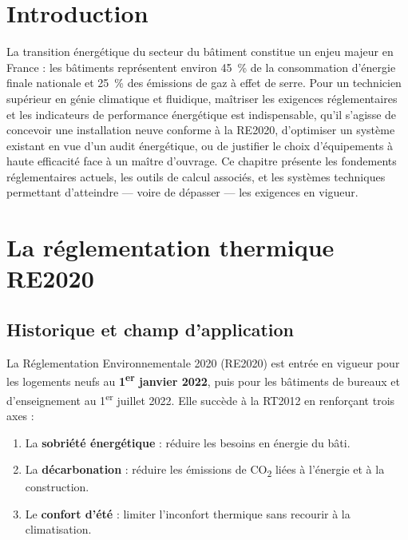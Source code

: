 \section{Introduction}

La transition énergétique du secteur du bâtiment constitue un enjeu majeur en France : les bâtiments représentent environ 45~\% de la consommation d'énergie finale nationale et 25~\% des émissions de gaz à effet de serre. Pour un technicien supérieur en génie climatique et fluidique, maîtriser les exigences réglementaires et les indicateurs de performance énergétique est indispensable, qu'il s'agisse de concevoir une installation neuve conforme à la RE2020, d'optimiser un système existant en vue d'un audit énergétique, ou de justifier le choix d'équipements à haute efficacité face à un maître d'ouvrage. Ce chapitre présente les fondements réglementaires actuels, les outils de calcul associés, et les systèmes techniques permettant d'atteindre — voire de dépasser — les exigences en vigueur.

\section{La réglementation thermique RE2020}

\subsection{Historique et champ d'application}

La Réglementation Environnementale 2020 (RE2020) est entrée en vigueur pour les logements neufs au \textbf{1\textsuperscript{er} janvier 2022}, puis pour les bâtiments de bureaux et d'enseignement au 1\textsuperscript{er} juillet 2022. Elle succède à la RT2012 en renforçant trois axes :

\begin{enumerate}
  \item La \textbf{sobriété énergétique} : réduire les besoins en énergie du bâti.
  \item La \textbf{décarbonation} : réduire les émissions de CO\textsubscript{2} liées à l'énergie et à la construction.
  \item Le \textbf{confort d'été} : limiter l'inconfort thermique sans recourir à la climatisation.
\end{enumerate}

